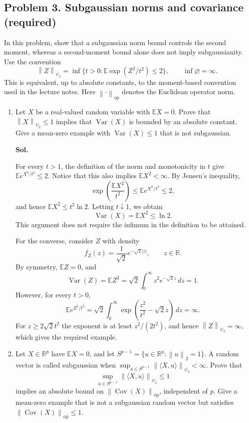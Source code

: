 \documentclass[lang=en,11pt,a4paper,citestyle=authoryear,nobib=true]{elegantpaper}
\newcommand{\R}{\mathbb{R}}
\newcommand{\E}{\mathbb{E}}
\newcommand{\norm}[1]{\left\lVert#1\right\rVert}
\begin{document}
\subsection*{Problem 3. Subgaussian norms and covariance (required)}
In this problem, show that a subgaussian norm bound controls the second
moment, whereas a second-moment bound alone does not imply subgaussianity.
Use the convention
\[
\norm{Z}_{\psi_2}
=\inf\{t>0:\E\exp(Z^2/t^2)\le2\},
\qquad\inf\varnothing=\infty.
\]
This is equivalent, up to absolute constants, to the moment-based
convention used in the lecture notes. Here $\norm{\cdot}_{\mathrm{op}}$
denotes the Euclidean operator norm.

\begin{enumerate}[label=(\arabic*),leftmargin=*]
\item Let $X$ be a real-valued random variable with $\E X=0$.
Prove that $\norm{X}_{\psi_2}\le1$ implies that $\operatorname{Var}(X)$
is bounded by an absolute constant. Give a mean-zero example with
$\operatorname{Var}(X)\le1$ that is not subgaussian.

\par\vspace{0.5em}\noindent\textbf{Sol.}\par
For every $t>1$, the definition of the norm and monotonicity in $t$ give
$\E e^{X^2/t^2}\le2$. Notice that this also implies $\E X^2<\infty$.
By Jensen's inequality,
\[
\exp\left(\frac{\E X^2}{t^2}\right)
\le\E e^{X^2/t^2}\le2,
\]
and hence $\E X^2\le t^2\ln2$. Letting $t\downarrow1$, we obtain
\[
\operatorname{Var}(X)=\E X^2\le\ln2.
\]
This argument does not require the infimum in the definition to be attained.

For the converse, consider $Z$ with density
\[
f_Z(z)=\frac1{\sqrt2}e^{-\sqrt2|z|},\qquad z\in\R.
\]
By symmetry, $\E Z=0$, and
\[
\operatorname{Var}(Z)=\E Z^2
=\sqrt2\int_0^\infty z^2e^{-\sqrt2z}\,dz=1.
\]
However, for every $t>0$,
\[
\E e^{Z^2/t^2}
=\sqrt2\int_0^\infty
\exp\left(\frac{z^2}{t^2}-\sqrt2z\right)\,dz=\infty.
\]
For $z\ge2\sqrt2t^2$ the exponent is at least $z^2/(2t^2)$,
and hence $\norm{Z}_{\psi_2}=\infty$, which gives the required example.
\vspace{1em}

\newpage
\item Let $X\in\R^p$ have $\E X=0$, and let
$S^{p-1}=\{u\in\R^p:\norm{u}_2=1\}$. A random vector is called
subgaussian when $\sup_{u\in S^{p-1}}\norm{\langle X,u\rangle}_{\psi_2}<\infty$.
Prove that
\[
\sup_{u\in S^{p-1}}\norm{\langle X,u\rangle}_{\psi_2}\le1
\]
implies an absolute bound on $\norm{\operatorname{Cov}(X)}_{\mathrm{op}}$,
independent of $p$. Give a mean-zero example that is not a subgaussian
random vector but satisfies $\norm{\operatorname{Cov}(X)}_{\mathrm{op}}\le1$.


\end{enumerate}
\end{document}
